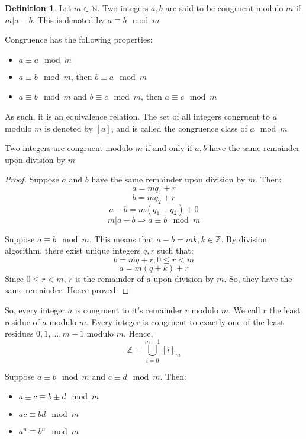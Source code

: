 \documentclass[12pt,letterpaper]{amsbook}
\theoremstyle{definition}
\newtheorem{definition}{Definition} %
\newcommand{\N}{\mathbb{N}}
\newcommand{\Z}{\mathbb{Z}}
\begin{document}
\begin{definition}
  Let $m \in \N$. Two integers $a,b$ are said to be congruent modulo $m$ if $m|a-b$. This is denoted by $a \equiv b \mod m$
\end{definition}

Congruence has the following properties:

\begin{itemize}
  \item $a \equiv a \mod m$
  \item $a \equiv b \mod m$, then $b \equiv a \mod m$
  \item $a \equiv b \mod m$ and $b \equiv c \mod m$, then $a \equiv c \mod m$
\end{itemize}

As such, it is an equivalence relation. The set of all integers congruent to $a$ modulo $m$ is denoted by $[a]$, and is called the congruence class of $a \mod m$

\begin{lemma}
  Two integers are congruent modulo $m$ if and only if $a,b$ have the same remainder upon division by $m$
\end{lemma}
\begin{proof}
Suppose $a$ and $b$ have the same remainder upon division by $m$. Then:
\[a = mq_1 + r\]
\[b = mq_2 + r\]
\[a-b = m(q_1-q_2) + 0\]
\[m|a-b \Rightarrow a \equiv b \mod m\]

Suppose $a \equiv b \mod m$. This means that $a-b = mk, k \in \Z$. By division algorithm, there exist unique integers $q,r$ such that:
\[b = mq+r, 0 \leq r < m\]
\[a = m(q+k) + r\]
Since $0 \leq r < m$, $r$ is the remainder of $a$ upon division by $m$. So, they have the same remainder. Hence proved.
\end{proof}

So, every integer $a$ is congruent to it's remainder $r$ modulo $m$. We call $r$ the least residue of $a$ modulo $m$. Every integer is congruent to exactly one of the least residues $0,1,...,m-1$ modulo $m$. Hence,
\[\Z = \bigcup_{i=0}^{m-1} [i]_m\]

\begin{lemma}
  Suppose $a \equiv b \mod m$ and $c \equiv d \mod m$. Then:
  \begin{itemize}
    \item $a \pm c \equiv b \pm d \mod m$
    \item $ac \equiv bd \mod m$
    \item $a^n \equiv b^n \mod m$
  \end{itemize}
\end{lemma}
\end{document}
